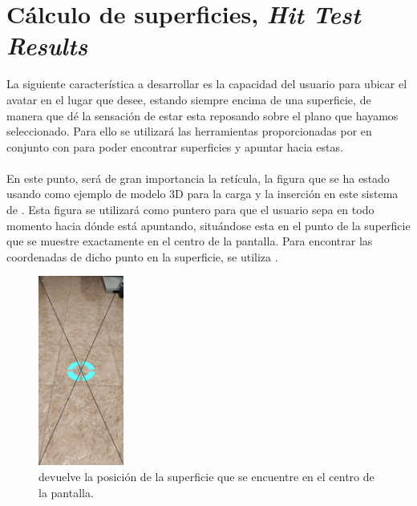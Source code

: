 \documentclass{subfiles}
\begin{document}
        \section{Cálculo de superficies, \textit{Hit Test Results}}
        \label{sec:calculo_de_superficies_hit_test_results}
        La siguiente característica a desarrollar es la capacidad del usuario para ubicar el avatar en el lugar que desee, estando siempre encima de una superficie, de manera que dé la sensación de estar esta reposando sobre el plano que hayamos seleccionado. Para ello se utilizará las herramientas proporcionadas por \webxr en conjunto con \threejs para poder encontrar superficies y apuntar hacia estas.

        \paragraph{}
        En este punto, será de gran importancia la retícula, la figura que se ha estado usando como ejemplo de modelo 3D para la carga y la inserción en este sistema de \ra. Esta figura se utilizará como puntero para que el usuario sepa en todo momento hacia dónde está apuntando, situándose esta en el punto de la superficie que se muestre exactamente en el centro de la pantalla. Para encontrar las coordenadas de dicho punto en la superficie, se utiliza \hittest.

\begin{figure}
\centering
\includegraphics[width=0.25\textwidth]{img/hit-test-example.jpg}
\caption{\hittest devuelve la posición  de la superficie que se encuentre en el centro de la pantalla.}
\label{fig:hit-test-example}
\end{figure}
\end{document}

